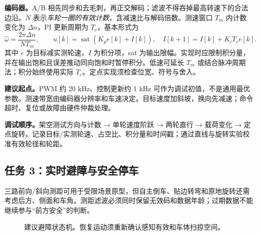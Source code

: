 \documentclass[UTF8,a4paper,zihao=-4,fontset=fandol]{ctexart}
\newcommand{\nextpage}{\clearpage}
\begin{document}
\textbf{编码器。}A/B 相先同步和去毛刺，再正交解码；滤波不得吞掉最高转速下的合法边沿。$N$ 表示\emph{车轮一圈的有效计数}，含减速比与解码倍数。测速窗口 $T_m$ 内计数变化为 $\Delta n$，PI 更新周期为 $T_c$，基本形式为
\[
 \widehat{\omega}=\frac{2\pi\Delta n}{N T_m},\qquad
 u[k]=\operatorname{sat}\!\left(K_p e[k]+I[k]\right),\quad
 I[k+1]=I[k]+K_i T_c e[k].
\]
其中 $e$ 为目标减实测轮速，$I$ 为积分项，sat 为输出限幅。实现时应限制积分量，并在输出饱和且误差推动同向饱和时暂停积分。低速可延长 $T_m$ 或结合脉冲周期法；积分始终使用实际 $T_c$。定点实现须检查位宽、符号与舍入。

\textbf{建议起点。}PWM 约 20 kHz、控制更新约 1 kHz 可作为调试初值，不是通用最优参数。测速带宽由编码器分辨率和车速决定。目标速度加斜坡，换向先减速；命令超时、复位或故障由硬件仲裁处理。

\textbf{调试顺序。}架空测试方向与计数 → 单轮速度阶跃 → 两轮直行 → 载荷变化 → 定点旋转。记录目标/实测轮速、占空比、积分量和时间戳；通过直线与旋转实验校准有效轮径和轮距。\cite{diffdrive}

\nextpage
\subsection{任务 3：实时避障与安全停车}

三路前向/斜向测距可用于受限场景原型，但自主倒车、贴边转弯和原地旋转还需考虑后方、侧面和车角。测距滤波必须同时保留无效码和数据年龄；过期数据不能继续参与“前方安全”的判断。

\begin{figure}[H]\centering
{}
\caption{建议避障状态机。恢复运动须重新确认感知有效和车体扫掠空间。}\label{fig:avoid}
\end{figure}
\end{document}
